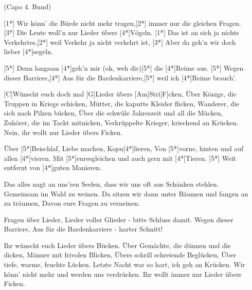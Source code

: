 
{\footnotesize(Capo 4. Bund)}

\begin{guitar}
	[1*] Wir könn' die Bürde nicht mehr tragen,[2*] immer nur die gleichen Fragen.
	[3*] Die Leute woll'n nur Lieder übers [4*]Vögeln.
	[1*] Das ist an sich ja nichts Verkehrtes,[2*] weil Verkehr ja nicht verkehrt ist,
	[3*] Aber da geh'n wir doch lieber [4*]segeln.
	
	[5*] Denn langsam [4*]geh'n mir (oh, weh dir)[5*] die [4*]Reime aus.
	[5*] Wegen dieser Barriere,[4*] Aus für die Bardenkarriere,[5*] weil ich [4*]Reime brauch'.
	
	[C]Wünscht euch doch mal [G]Lieder übers [Am]Stri[F]cken,
	Über Könige, die Truppen in Kriege schicken,
	Mütter, die kaputte Kleider flicken,
	Wanderer, die sich nach Pilzen bücken,
	Über die schwüle Jahreszeit und all die Mücken,
	Zuhörer, die im Tackt mitnicken,
	Verkrüppelte Krieger, kriechend an Krücken.
	Nein, ihr wollt nur Lieder übers Ficken.
	
	Über [5*]Beischlaf, Liebe machen, Kopu[4*]lieren,
	Von [5*]vorne, hinten und auf allen [4*]vieren.
	Mit [5*]euresgleichen und auch gern mit [4*]Tieren.
	[5*] Weit entfernt von [4*]guten Manieren.
	
	\pagebreak
	
	Das alles nagt an uns'ren Seelen, dass wir uns oft aus Schänken stehlen.
	Gemeinsam im Wald zu weinen.
	Da sitzen wir dann unter Bäumen und fangen an zu träumen,
	Davon eure Fragen zu verneinen.
	
	Fragen über Lieder, Lieder voller Glieder - bitte Schluss damit.
	Wegen dieser Barriere, Aus für die Bardenkarriere - harter Schnitt!
	
	Ihr wünscht euch Lieder übers Bücken.
	Über Gemächte, die dünnen und die dicken,
	Männer mit frivolen Blicken,
	Übers schrill schreiende Beglücken,
	Über tiefe, warme, feuchte Lücken.
	Letzte Nacht war so hart, ich geh an Krücken.
	Wir könn' nicht mehr und werden uns verdrücken.
	Ihr wollt immer nur Lieder übers Ficken.
	

\end{guitar}
